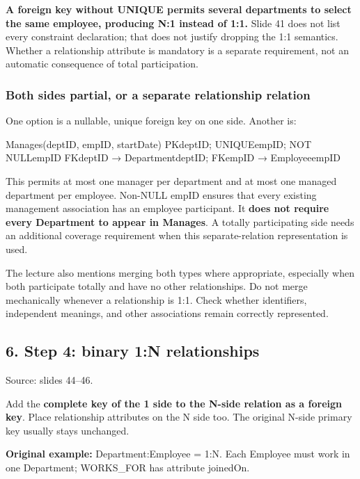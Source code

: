\textbf{A foreign key without UNIQUE permits several departments to select the same employee, producing N:1 instead of 1:1.} Slide 41 does not list every constraint declaration; that does not justify dropping the 1:1 semantics. Whether a relationship attribute is mandatory is a separate requirement, not an automatic consequence of total participation.

\subsubsection{Both sides partial, or a separate relationship relation}\label{04_er_to_relational_mapping_en-both-sides-partial-or-a-separate-relationship-relation}

One option is a nullable, unique foreign key on one side. Another is:

\begin{StudyCode}
Manages(deptID, empID, startDate)
PK{deptID}; UNIQUE{empID}; NOT NULL{empID}
FK{deptID} → Department{deptID}; FK{empID} → Employee{empID}
\end{StudyCode}

This permits at most one manager per department and at most one managed department per employee. Non-NULL empID ensures that every existing management association has an employee participant. It \textbf{does not require every Department to appear in Manages}. A totally participating side needs an additional coverage requirement when this separate-relation representation is used.

The lecture also mentions merging both types where appropriate, especially when both participate totally and have no other relationships. Do not merge mechanically whenever a relationship is 1:1. Check whether identifiers, independent meanings, and other associations remain correctly represented.

\subsection{6. Step 4: binary 1:N relationships}\label{04_er_to_relational_mapping_en-step-4-binary-1n-relationships}

Source: slides 44--46.

Add the \textbf{complete key of the 1 side to the N-side relation as a foreign key}. Place relationship attributes on the N side too. The original N-side primary key usually stays unchanged.

\textbf{Original example:} Department:Employee = 1:N. Each Employee must work in one Department; WORKS\_FOR has attribute joinedOn.

